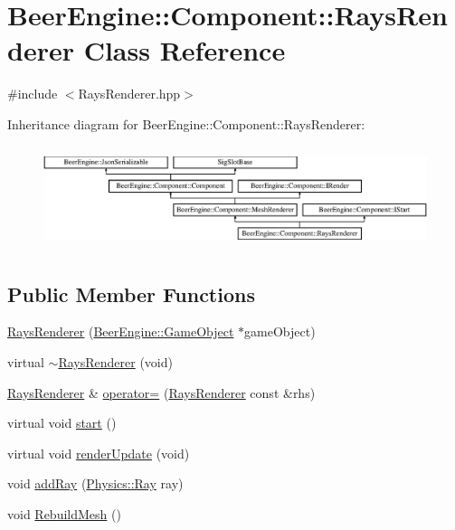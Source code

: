 \hypertarget{class_beer_engine_1_1_component_1_1_rays_renderer}{}\section{Beer\+Engine\+:\+:Component\+:\+:Rays\+Renderer Class Reference}
\label{class_beer_engine_1_1_component_1_1_rays_renderer}


{\ttfamily \#include $<$Rays\+Renderer.\+hpp$>$}

Inheritance diagram for Beer\+Engine\+:\+:Component\+:\+:Rays\+Renderer\+:\begin{figure}[H]
\begin{center}
\leavevmode
\includegraphics[height=3.047619cm]{class_beer_engine_1_1_component_1_1_rays_renderer}
\end{center}
\end{figure}
\subsection*{Public Member Functions}
\begin{DoxyCompactItemize}
\item 
\mbox{\hyperlink{class_beer_engine_1_1_component_1_1_rays_renderer_a0d3637f17a8c0c6e159a52a196834bb6}{Rays\+Renderer}} (\mbox{\hyperlink{class_beer_engine_1_1_game_object}{Beer\+Engine\+::\+Game\+Object}} $\ast$game\+Object)
\item 
virtual \mbox{\hyperlink{class_beer_engine_1_1_component_1_1_rays_renderer_a23d7ca257ec101eef546b51b0d6a6e36}{$\sim$\+Rays\+Renderer}} (void)
\item 
\mbox{\hyperlink{class_beer_engine_1_1_component_1_1_rays_renderer}{Rays\+Renderer}} \& \mbox{\hyperlink{class_beer_engine_1_1_component_1_1_rays_renderer_af7fb2a4d060a59e907580d8689cf4256}{operator=}} (\mbox{\hyperlink{class_beer_engine_1_1_component_1_1_rays_renderer}{Rays\+Renderer}} const \&rhs)
\item 
virtual void \mbox{\hyperlink{class_beer_engine_1_1_component_1_1_rays_renderer_a309d7940148feada1c9497e2444a6548}{start}} ()
\item 
virtual void \mbox{\hyperlink{class_beer_engine_1_1_component_1_1_rays_renderer_a1647c9a5f40fc9186ccb6d55b7ebfe5e}{render\+Update}} (void)
\item 
void \mbox{\hyperlink{class_beer_engine_1_1_component_1_1_rays_renderer_a0597197520e656dde062527344d050e0}{add\+Ray}} (\mbox{\hyperlink{struct_beer_engine_1_1_physics_1_1_ray}{Physics\+::\+Ray}} ray)
\item 
void \mbox{\hyperlink{class_beer_engine_1_1_component_1_1_rays_renderer_ab452c92a57a002fced157ec9913d40c8}{Rebuild\+Mesh}} ()
\end{DoxyCompactItemize}
